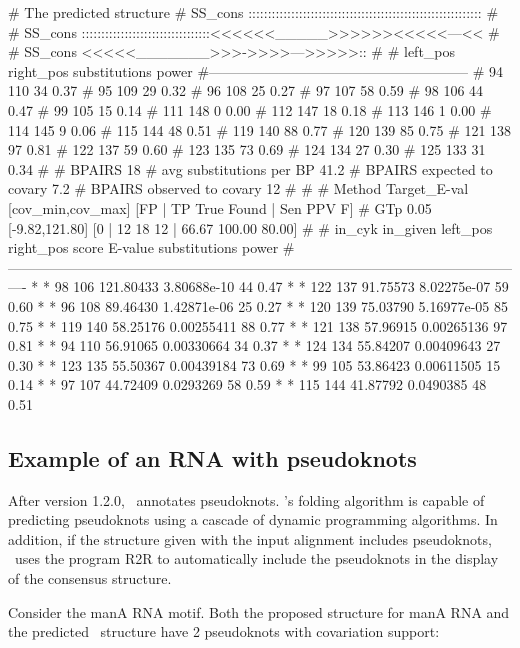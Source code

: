 \begin{sreoutput}
# The predicted structure
# SS_cons ::::::::::::::::::::::::::::::::::::::::::::::::::::::::::::
#
# SS_cons :::::::::::::::::::::::::::::::::<<<<<<_____>>>>>><<<<<---<<
#
# SS_cons <<<<<_______>>>->>>>--->>>>>::
#
# left_pos      right_pos    substitutions      power
#--------------------------------------------------------
# 94		110		34		0.37
# 95		109		29		0.32
# 96		108		25		0.27
# 97		107		58		0.59
# 98		106		44		0.47
# 99		105		15		0.14
# 111		148		0		0.00
# 112		147		18		0.18
# 113		146		1		0.00
# 114		145		9		0.06
# 115		144		48		0.51
# 119		140		88		0.77
# 120		139		85		0.75
# 121		138		97		0.81
# 122		137		59		0.60
# 123		135		73		0.69
# 124		134		27		0.30
# 125		133		31		0.34
#
# BPAIRS 18
# avg substitutions per BP  41.2
# BPAIRS expected to covary 7.2
# BPAIRS observed to covary 12
#
#
# Method Target_E-val [cov_min,cov_max] [FP | TP True Found | Sen PPV F] 
# GTp    0.05         [-9.82,121.80]     [0 | 12 18 12 | 66.67 100.00 80.00] 
#
# in_cyk in_given   left_pos       right_pos      score           E-value    substitutions      power
#----------------------------------------------------------------------------------------------------------------
*	*	        98	       106	121.80433	3.80688e-10	44		0.47
*	*	       122	       137	91.75573	8.02275e-07	59		0.60
*	*	        96	       108	89.46430	1.42871e-06	25		0.27
*	*	       120	       139	75.03790	5.16977e-05	85		0.75
*	*	       119	       140	58.25176	0.00255411	88		0.77
*	*	       121	       138	57.96915	0.00265136	97		0.81
*	*	        94	       110	56.91065	0.00330664	34		0.37
*	*	       124	       134	55.84207	0.00409643	27		0.30
*	*	       123	       135	55.50367	0.00439184	73		0.69
*	*	        99	       105	53.86423	0.00611505	15		0.14
*	*	        97	       107	44.72409	0.0293269	58		0.59
*	*	       115	       144	41.87792	0.0490385	48		0.51
\end{sreoutput}


\subsection{Example of an RNA with pseudoknots}

After version 1.2.0, \rscape\ annotates pseudoknots. \rscape's folding
algorithm is capable of predicting pseudoknots using a cascade of
dynamic programming algorithms.  In addition, if the structure given
with the input alignment includes pseudoknots, \rscape\ uses the
program R2R to automatically include the pseudoknots in the display of
the consensus structure.

Consider the manA RNA motif. Both the proposed structure for manA RNA
and the predicted \rscape\ structure have 2 pseudoknots with
covariation support:


